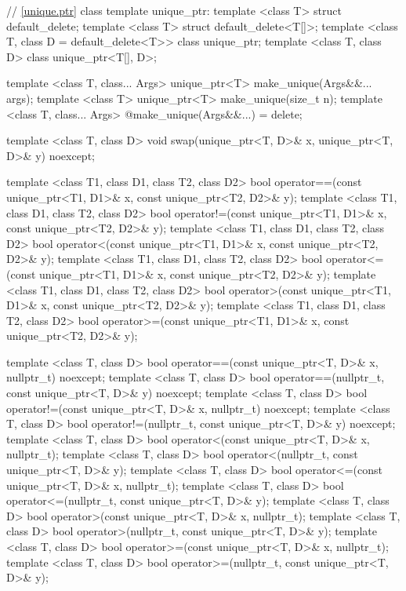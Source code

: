 \begin{codeblock}
{  // \ref{unique.ptr} class template unique_ptr:
  template <class T> struct default_delete;
  template <class T> struct default_delete<T[]>;
  template <class T, class D = default_delete<T>> class unique_ptr;
  template <class T, class D> class unique_ptr<T[], D>;

  template <class T, class... Args> unique_ptr<T> make_unique(Args&&... args);
  template <class T> unique_ptr<T> make_unique(size_t n);
  template <class T, class... Args> @\unspec@ make_unique(Args&&...) = delete;

  template <class T, class D> void swap(unique_ptr<T, D>& x, unique_ptr<T, D>& y) noexcept;

  template <class T1, class D1, class T2, class D2>
    bool operator==(const unique_ptr<T1, D1>& x, const unique_ptr<T2, D2>& y);
  template <class T1, class D1, class T2, class D2>
    bool operator!=(const unique_ptr<T1, D1>& x, const unique_ptr<T2, D2>& y);
  template <class T1, class D1, class T2, class D2>
    bool operator<(const unique_ptr<T1, D1>& x, const unique_ptr<T2, D2>& y);
  template <class T1, class D1, class T2, class D2>
    bool operator<=(const unique_ptr<T1, D1>& x, const unique_ptr<T2, D2>& y);
  template <class T1, class D1, class T2, class D2>
    bool operator>(const unique_ptr<T1, D1>& x, const unique_ptr<T2, D2>& y);
  template <class T1, class D1, class T2, class D2>
    bool operator>=(const unique_ptr<T1, D1>& x, const unique_ptr<T2, D2>& y);

  template <class T, class D>
    bool operator==(const unique_ptr<T, D>& x, nullptr_t) noexcept;
  template <class T, class D>
    bool operator==(nullptr_t, const unique_ptr<T, D>& y) noexcept;
  template <class T, class D>
    bool operator!=(const unique_ptr<T, D>& x, nullptr_t) noexcept;
  template <class T, class D>
    bool operator!=(nullptr_t, const unique_ptr<T, D>& y) noexcept;
  template <class T, class D>
    bool operator<(const unique_ptr<T, D>& x, nullptr_t);
  template <class T, class D>
    bool operator<(nullptr_t, const unique_ptr<T, D>& y);
  template <class T, class D>
    bool operator<=(const unique_ptr<T, D>& x, nullptr_t);
  template <class T, class D>
    bool operator<=(nullptr_t, const unique_ptr<T, D>& y);
  template <class T, class D>
    bool operator>(const unique_ptr<T, D>& x, nullptr_t);
  template <class T, class D>
    bool operator>(nullptr_t, const unique_ptr<T, D>& y);
  template <class T, class D>
    bool operator>=(const unique_ptr<T, D>& x, nullptr_t);
  template <class T, class D>
    bool operator>=(nullptr_t, const unique_ptr<T, D>& y);

}
\end{codeblock}
